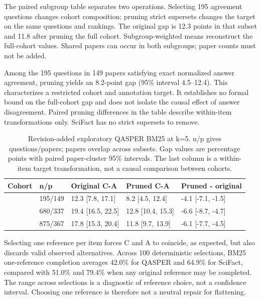 \documentclass[twoside,a4paper,11pt]{article}
\begin{document}
The paired subgroup table separates two operations. Selecting 195 agreement questions changes cohort composition; pruning strict supersets changes the target on the same questions and rankings. The original gap is 12.3 points in that subset and 11.8 after pruning the full cohort. Subgroup-weighted means reconstruct the full-cohort values. Shared papers can occur in both subgroups; paper counts must not be added.

Among the 195 questions in 149 papers satisfying exact normalized answer agreement, pruning yields an 8.2-point gap (95\% interval 4.5--12.4). This characterizes a restricted cohort and annotation target. It establishes no formal bound on the full-cohort gap and does not isolate the causal effect of answer disagreement. Paired pruning differences in the table describe within-item transformations only. SciFact has no strict supersets to remove.

\begin{table}[!htbp]\centering\small\caption{Revision-added exploratory QASPER BM25 at k=5. n/p gives questions/papers; papers overlap across subsets. Gap values are percentage points with paired paper-cluster 95\% intervals. The last column is a within-item target transformation, not a causal comparison between cohorts.}
\begin{tabular}{>{\raggedright\arraybackslash}p{57.0pt}>{\raggedright\arraybackslash}p{38.0pt}>{\raggedright\arraybackslash}p{93.0pt}>{\raggedright\arraybackslash}p{92.0pt}>{\raggedright\arraybackslash}p{92.0pt}}
\toprule
\textbf{Cohort} & \textbf{n/p} & \textbf{Original C-A} & \textbf{Pruned C-A} & \textbf{Pruned - original} \\
\midrule
{Exact agreement} & {195/149} & {12.3 [7.8, 17.1]} & {8.2 [4.5, 12.4]} & {-4.1 [-7.1, -1.5]} \\
{Complement} & {680/337} & {19.4 [16.5, 22.5]} & {12.8 [10.4, 15.3]} & {-6.6 [-8.7, -4.7]} \\
{Full cohort} & {875/367} & {17.8 [15.3, 20.4]} & {11.8 [9.7, 13.9]} & {-6.1 [-7.7, -4.5]} \\
\bottomrule\end{tabular}\end{table}
Selecting one reference per item forces C and A to coincide, as expected, but also discards valid observed alternatives. Across 100 deterministic selections, BM25 one-reference completion averages 42.0\% for QASPER and 64.9\% for SciFact, compared with 51.0\% and 79.4\% when any original reference may be completed. The range across selections is a diagnostic of reference choice, not a confidence interval. Choosing one reference is therefore not a neutral repair for flattening.
\end{document}
